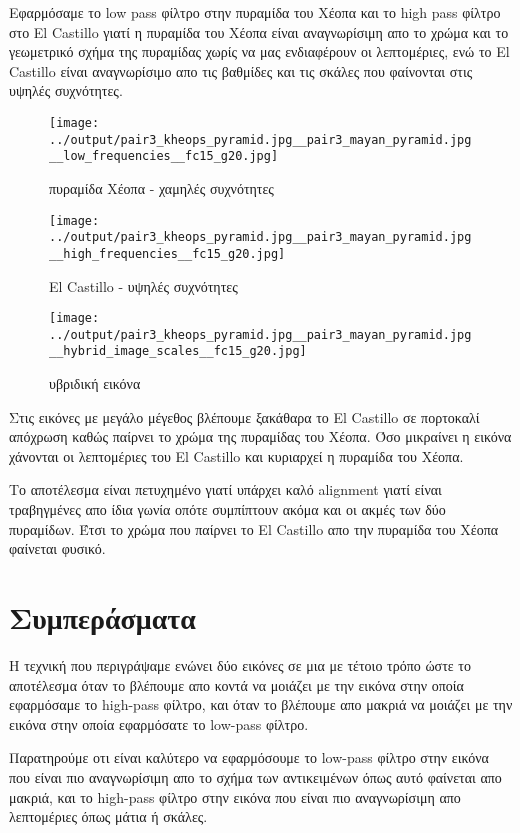 \documentclass[11pt]{scrartcl} %
\begin{document}
Εφαρμόσαμε το low pass φίλτρο στην πυραμίδα του Χέοπα και το high pass φίλτρο στο El Castillo γιατί η πυραμίδα του Χέοπα είναι αναγνωρίσιμη απο το χρώμα και το γεωμετρικό σχήμα της πυραμίδας χωρίς να μας ενδιαφέρουν οι λεπτομέριες, ενώ το El Castillo είναι αναγνωρίσιμο απο τις βαθμίδες και τις σκάλες που φαίνονται στις υψηλές συχνότητες.
\begin{figure}[H]
  \begin{minipage}[c]{9cm}
    \texttt{[image: ../output/pair3\_kheops\_pyramid.jpg\_\_pair3\_mayan\_pyramid.jpg\_\_low\_frequencies\_\_fc15\_g20.jpg]}
    \caption{πυραμίδα Χέοπα - χαμηλές συχνότητες}
  \end{minipage}
  \begin{minipage}[c]{9cm}
    \texttt{[image: ../output/pair3\_kheops\_pyramid.jpg\_\_pair3\_mayan\_pyramid.jpg\_\_high\_frequencies\_\_fc15\_g20.jpg]}
    \caption{El Castillo - υψηλές συχνότητες}
  \end{minipage}
\end{figure}
\begin{figure}[H]
  \texttt{[image: ../output/pair3\_kheops\_pyramid.jpg\_\_pair3\_mayan\_pyramid.jpg\_\_hybrid\_image\_scales\_\_fc15\_g20.jpg]}
  \caption{υβριδική εικόνα}
\end{figure}
Στις εικόνες με μεγάλο μέγεθος βλέπουμε ξακάθαρα το El Castillo σε πορτοκαλί απόχρωση καθώς παίρνει το χρώμα της πυραμίδας του Χέοπα. Όσο μικραίνει η εικόνα χάνονται οι λεπτομέριες του El Castillo και κυριαρχεί η πυραμίδα του Χέοπα.

Το αποτέλεσμα είναι πετυχημένο γιατί υπάρχει καλό alignment γιατί είναι τραβηγμένες απο ίδια γωνία οπότε συμπίπτουν ακόμα και οι ακμές των δύο πυραμίδων. Έτσι το χρώμα που παίρνει το El Castillo απο την πυραμίδα του Χέοπα φαίνεται φυσικό.

\section{Συμπεράσματα}

Η τεχνική που περιγράψαμε ενώνει δύο εικόνες σε μια με τέτοιο τρόπο ώστε το αποτέλεσμα όταν το βλέπουμε απο κοντά να μοιάζει με την εικόνα στην οποία εφαρμόσαμε το high-pass φίλτρο, και όταν το βλέπουμε απο μακριά να μοιάζει με την εικόνα στην οποία εφαρμόσατε το low-pass φίλτρο.

Παρατηρούμε οτι είναι καλύτερο να εφαρμόσουμε το low-pass φίλτρο στην εικόνα που είναι πιο αναγνωρίσιμη απο το σχήμα των αντικειμένων όπως αυτό φαίνεται απο μακριά,
και το high-pass φίλτρο στην εικόνα που είναι πιο αναγνωρίσιμη απο λεπτομέριες όπως μάτια ή σκάλες.
\end{document}
